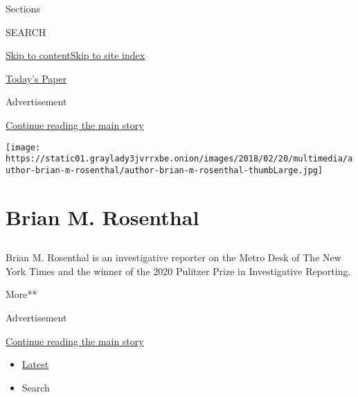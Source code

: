 Sections

SEARCH

\protect\hyperlink{site-content}{Skip to
content}\protect\hyperlink{site-index}{Skip to site index}

\href{https://myaccount.nytimes3xbfgragh.onion/auth/login?response_type=cookie\&client_id=vi}{}

\href{https://www.nytimes3xbfgragh.onion/section/todayspaper}{Today's
Paper}

Advertisement

\protect\hyperlink{after-top}{Continue reading the main story}

\texttt{[image: https://static01.graylady3jvrrxbe.onion/images/2018/02/20/multimedia/author-brian-m-rosenthal/author-brian-m-rosenthal-thumbLarge.jpg]}

\hypertarget{brian-m-rosenthal}{%
\section{Brian M. Rosenthal}\label{brian-m-rosenthal}}

\subsection{}

Brian M. Rosenthal is an investigative reporter on the Metro Desk of The
New York Times and the winner of the 2020 Pulitzer Prize in
Investigative Reporting.

More**

Advertisement

\protect\hyperlink{after-mid1}{Continue reading the main story}

\begin{itemize}
\tightlist
\item
  \protect\hyperlink{stream-panel}{Latest}
\item
  Search
\end{itemize}

